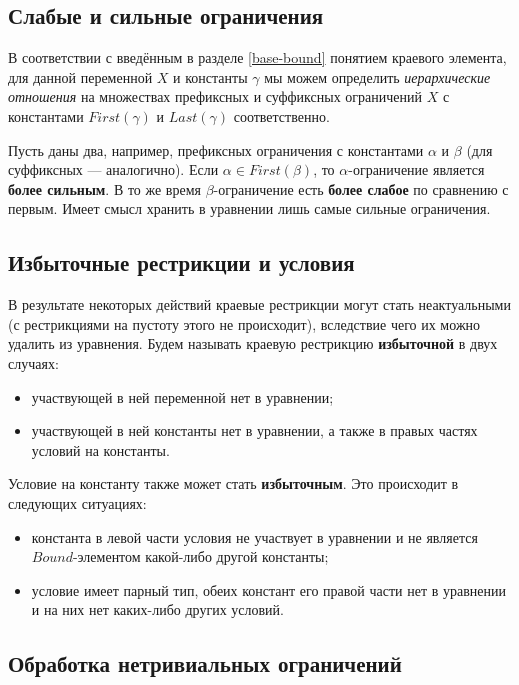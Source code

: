 \documentclass[12pt]{article}
\begin{document}
\subsection{Слабые и сильные ограничения}

В соответствии с введённым в разделе \ref{base-bound} понятием краевого
элемента, для данной переменной $X$ и константы $\gamma$ мы можем определить
\textit{иерархические отношения} на множествах префиксных и суффиксных
ограничений $X$ с константами $First(\gamma)$ и $Last(\gamma)$ соответственно.

Пусть даны два, например, префиксных ограничения с константами $\alpha$ и
$\beta$ (для суффиксных --- аналогично). Если $\alpha \in First(\beta)$, то
$\alpha$-ограничение является \textbf{более сильным}. В то же время
$\beta$-ограничение есть \textbf{более слабое} по сравнению с первым. Имеет
смысл хранить в уравнении лишь самые сильные ограничения.


\subsection{Избыточные рестрикции и условия}

В результате некоторых действий краевые рестрикции могут стать неактуальными
(с рестрикциями на пустоту этого не происходит), вследствие чего их можно
удалить из уравнения. Будем называть краевую рестрикцию \textbf{избыточной} в
двух случаях:
\begin{itemize}
  \item участвующей в ней переменной нет в уравнении;
  \item участвующей в ней константы нет в уравнении, а также в правых частях
  условий на константы.
\end{itemize}

Условие на константу также может стать \textbf{избыточным}. Это происходит в
следующих ситуациях:
\begin{itemize}
  \item константа в левой части условия не участвует в уравнении и не является
  $Bound$-элементом какой-либо другой константы;
  \item условие имеет парный тип, обеих констант его правой части нет в
  уравнении и на них нет каких-либо других условий.
\end{itemize}


\subsection{Обработка нетривиальных ограничений}
\end{document}

